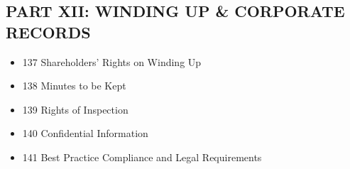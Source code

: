 \subsection*{PART XII: WINDING UP \& CORPORATE RECORDS}
\begin{itemize}[leftmargin=1em]
    \item 137 Shareholders' Rights on Winding Up
    \item 138 Minutes to be Kept
    \item 139 Rights of Inspection
    \item 140 Confidential Information
    \item 141 Best Practice Compliance and Legal Requirements
\end{itemize}

\newpage 
